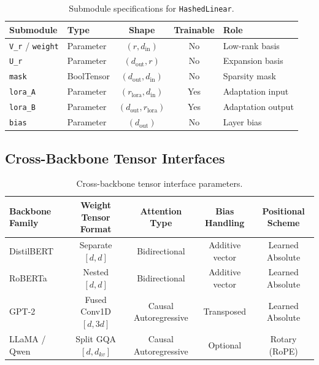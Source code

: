 \begin{table}[H]
\centering
\small
\begin{tabular}{llccp{5cm}}
\toprule
\textbf{Submodule} & \textbf{Type} & \textbf{Shape} & \textbf{Trainable} & \textbf{Role} \\
\midrule
\texttt{V\_r} / \texttt{weight} & Parameter & $(r, d_{\text{in}})$ & No & Low-rank basis \\
\texttt{U\_r} & Parameter & $(d_{\text{out}}, r)$ & No & Expansion basis \\
\texttt{mask} & BoolTensor & $(d_{\text{out}}, d_{\text{in}})$ & No & Sparsity mask \\
\texttt{lora\_A} & Parameter & $(r_{\text{lora}}, d_{\text{in}})$ & Yes & Adaptation input \\
\texttt{lora\_B} & Parameter & $(d_{\text{out}}, r_{\text{lora}})$ & Yes & Adaptation output \\
\texttt{bias} & Parameter & $(d_{\text{out}})$ & No & Layer bias \\
\bottomrule
\end{tabular}
\caption{Submodule specifications for \texttt{HashedLinear}.}
\label{tab:submodules_hashedlinear}
\end{table}

\subsection{Cross-Backbone Tensor Interfaces}
\begin{table}[H]
\centering
\small
\begin{tabular}{lcccc}
\toprule
\textbf{Backbone Family} & \textbf{Weight Tensor Format} & \textbf{Attention Type} & \textbf{Bias Handling} & \textbf{Positional Scheme} \\
\midrule
DistilBERT & Separate $[d, d]$ & Bidirectional & Additive vector & Learned Absolute \\
RoBERTa & Nested $[d, d]$ & Bidirectional & Additive vector & Learned Absolute \\
GPT-2 & Fused Conv1D $[d, 3d]$ & Causal Autoregressive & Transposed & Learned Absolute \\
LLaMA / Qwen & Split GQA $[d, d_{kv}]$ & Causal Autoregressive & Optional & Rotary (RoPE) \\
\bottomrule
\end{tabular}
\caption{Cross-backbone tensor interface parameters.}
\label{tab:backbone_interfaces}
\end{table}

